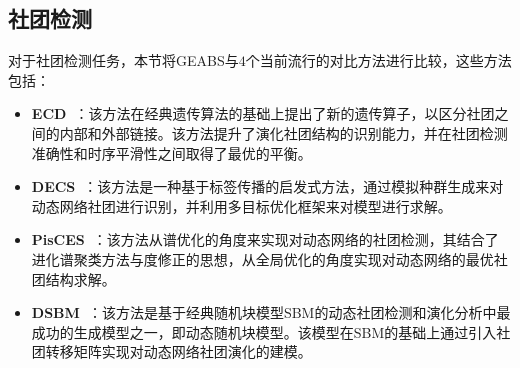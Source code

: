 \subsection{社团检测}
对于社团检测任务，本节将GEABS与$4$个当前流行的对比方法进行比较，这些方法包括：
\begin{itemize}
  \item \textbf{ECD~\cite{liu2019evolutionary}}：该方法在经典遗传算法的基础上提出了新的遗传算子，以区分社团之间的内部和外部链接。该方法提升了演化社团结构的识别能力，并在社团检测准确性和时序平滑性之间取得了最优的平衡。
  \item \textbf{DECS~\cite{liu2020detecting}}：该方法是一种基于标签传播的启发式方法，通过模拟种群生成来对动态网络社团进行识别，并利用多目标优化框架来对模型进行求解。
  \item \textbf{PisCES~\cite{liu2018using}}：该方法从谱优化的角度来实现对动态网络的社团检测，其结合了进化谱聚类方法与度修正的思想，从全局优化的角度实现对动态网络的最优社团结构求解。
  \item \textbf{DSBM~\cite{yang2011detecting}}：该方法是基于经典随机块模型SBM的动态社团检测和演化分析中最成功的生成模型之一，即动态随机块模型。该模型在SBM的基础上通过引入社团转移矩阵实现对动态网络社团演化的建模。
\end{itemize}

